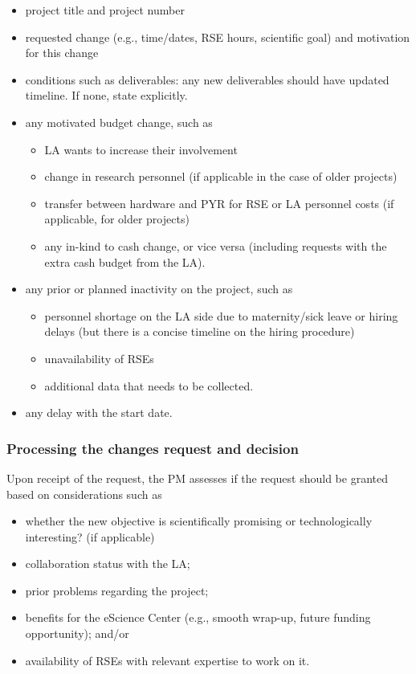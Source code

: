 \begin{itemize}\itemsep0em
\item project title and project number
\item requested change (e.g., time/dates, RSE hours, scientific goal) and motivation for this change
\item conditions such as deliverables: any new deliverables should have updated timeline. If none, state explicitly.
\item any motivated budget change, such as 
\begin{itemize}
\item LA wants to increase their involvement 
\item change in research personnel (if applicable in the case of older projects)
\item transfer between hardware and PYR for RSE or LA personnel costs (if applicable, for older projects)
\item any in-kind to cash change, or vice versa (including requests with the extra cash budget from the LA).
\end{itemize}
\item any prior or planned inactivity on the project, such as
\begin{itemize}
\item personnel shortage on the LA side due to maternity/sick leave or hiring delays (but there is a concise timeline on the hiring procedure)
\item unavailability of RSEs 
\item additional data that needs to be collected.
\end{itemize}
\item any delay with the start date.
\end{itemize}


\subsubsection{Processing the changes request and decision}
Upon receipt of the request, the PM assesses if the request should be granted based on considerations such as 
\begin{itemize}\itemsep0em
\item whether the new objective is scientifically promising or technologically interesting? (if applicable)
\item collaboration status with the LA;
\item prior problems regarding the project;
\item benefits for the eScience Center (e.g., smooth wrap-up, future funding opportunity); and/or
\item availability of RSEs with relevant expertise to work on it.
\end{itemize}


